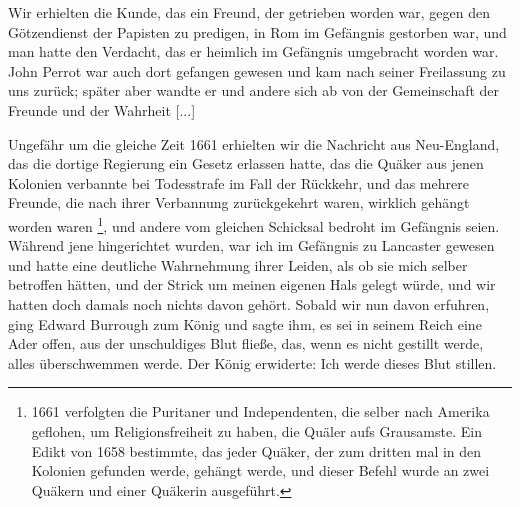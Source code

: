 Wir erhielten die Kunde, das ein Freund, der getrieben worden
war, gegen den Götzendienst der Papisten zu predigen, in Rom
im Gefängnis gestorben war, und man hatte den Verdacht, das
er heimlich im Gefängnis umgebracht worden war. John Perrot 
war auch dort gefangen gewesen und kam nach seiner Freilassung
zu uns zurück; später aber wandte er und andere sich ab von
der Gemeinschaft der Freunde und der Wahrheit [...]

Ungefähr um die gleiche Zeit 1661 erhielten wir die Nachricht 
aus Neu-England, das die dortige Regierung ein Gesetz
erlassen hatte, das die Quäker aus jenen Kolonien verbannte bei
Todesstrafe im Fall der Rückkehr, und das mehrere Freunde, die
nach ihrer Verbannung zurückgekehrt waren, wirklich gehängt
worden waren \footnote{1661 verfolgten die Puritaner und 
Independenten, die selber nach Amerika geflohen, um 
Religionsfreiheit zu haben, die Quäler aufs Grausamste.
Ein Edikt von 1658 bestimmte, das jeder Quäker, der zum dritten 
mal in den Kolonien gefunden werde, gehängt werde, und 
dieser Befehl wurde an zwei Quäkern und einer Quäkerin 
ausgeführt.}, und andere vom gleichen Schicksal bedroht im
Gefängnis seien. Während jene hingerichtet wurden, war ich im
Gefängnis zu Lancaster gewesen und hatte eine deutliche Wahrnehmung 
ihrer Leiden, als ob sie mich selber betroffen hätten,
und der Strick um meinen eigenen Hals gelegt würde, und wir
hatten doch damals noch nichts davon gehört. Sobald wir nun
davon erfuhren, ging Edward Burrough zum König und sagte
ihm, es sei in seinem Reich eine Ader offen, aus der unschuldiges
Blut fließe, das, wenn es nicht gestillt werde, alles überschwemmen
werde. Der König erwiderte: \glqq Ich werde dieses Blut stillen.\grqq{}